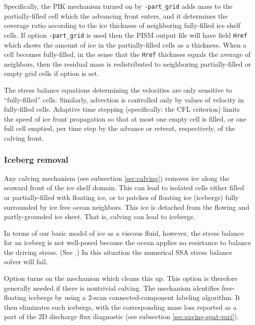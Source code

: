 Specifically, the PIK mechanism turned on by \texttt{-part_grid} adds mass to the partially-filled cell which the advancing front enters, and it determines the coverage ratio according to the ice thickness of neighboring fully-filled ice shelf cells.  If option \texttt{-part_grid} is used then the PISM output file will have field \texttt{Href} which shows the amount of ice in the partially-filled cells as a thickness.  When a cell becomes fully-filled, in the sense that the \texttt{Href} thickness equals the average of neighbors, then the residual mass is redistributed to neighboring partially-filled or empty grid cells if option  is set.

The stress balance equations determining the velocities are only sensitive to ``fully-filled'' cells.  Similarly, advection is controlled only by values of velocity in fully-filled cells.  Adaptive time stepping (specifically: the CFL criterion) limits the speed of ice front propagation so that at most one empty cell is filled, or one full cell emptied, per time step by the advance or retreat, respectively, of the calving front.

\subsubsection{Iceberg removal}
\label{subsec:kill-icebergs}

Any calving mechanism (see subsection \ref{sec:calving}) removes ice along the seaward front of the ice shelf domain.  This can lead to isolated cells either filled or partially-filled with floating ice, or to patches of floating ice (icebergs) fully surrounded by ice free ocean neighbors.  This ice is detached from the flowing and partly-grounded ice sheet.  That is, calving can lead to icebergs.

In terms of our basic model of ice as a viscous fluid, however, the stress balance for an iceberg is not well-posed because the ocean applies no resistance to balance the driving stress.  (See \cite{SchoofStream}.)  In this situation the numerical SSA stress balance solver will fail.

Option  turns on the mechanism which cleans this up.  This option is therefore generally needed if there is nontrivial calving.  The mechanism identifies free-floating icebergs by using a 2-scan connected-component labeling algorithm.  It then eliminates such icebergs, with the corresponding mass loss reported as a part of the 2D discharge flux diagnostic (see subsection \ref{sec:saving-spat-vari}).

